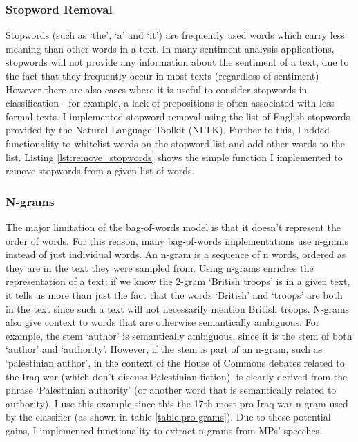 \documentclass[12pt,a4paper,twoside,openright]{report}
\newcommand{\mylisting}[4]{}
\newcommand{\pylisting}[2]{\mylisting{Python}{py}{#1}{#2}}
\begin{document}
\subsubsection{Stopword Removal} \label{impl-stop}

Stopwords (such as `the', `a' and `it') are frequently used words which carry less meaning than other words in a text. In many sentiment analysis applications, stopwords will not provide any information about the sentiment of a text, due to the fact that they frequently occur in most texts (regardless of sentiment) However there are also cases where it is useful to consider stopwords in classification - for example, a lack of prepositions is often associated with less formal texts. I implemented stopword removal using the list of English stopwords provided by the Natural Language Toolkit (NLTK). Further to this, I added functionality to whitelist words on the stopword list and add other words to the list. Listing \ref{lst:remove_stopwords} shows the simple function I implemented to remove stopwords from a given list of words.

\pylisting{A function which removes the stopwords and words on from a given list of words.}{remove_stopwords}

\subsubsection{N-grams}

The major limitation of the bag-of-words model is that it doesn't represent the order of words. For this reason, many bag-of-words implementations use n-grams instead of just individual words. An n-gram is a sequence of n words, ordered as they are in the text they were sampled from. Using n-grams enriches the representation of a text; if we know the 2-gram `British troops' is in a given text, it tells us more than just the fact that the words `British' and `troops' are both in the text since such a text will not necessarily mention British troops. N-grams also give context to words that are otherwise semantically ambiguous. For example, the stem `author' is semantically ambiguous, since it is the stem of both `author' and `authority'. However, if the stem is part of an n-gram, such as `palestinian author', in the context of the House of Commons debates related to the Iraq war (which don't discuss Palestinian fiction), is clearly derived from the phrase `Palestinian authority' (or another word that is semantically related to authority). I use this example since this the 17th most pro-Iraq war n-gram used by the classifier (as shown in table \ref{table:pro-grams}). Due to these potential gains, I implemented functionality to extract n-grams from MPs' speeches.
\end{document}
